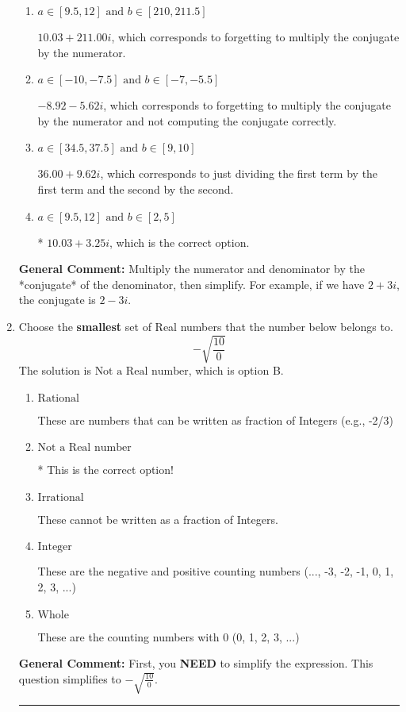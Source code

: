 \documentclass{extbook}[14pt]
\newcommand{\litem}[1]{\item #1

\rule{\textwidth}{0.4pt}}
\begin{document}
\begin{enumerate}
{\begin{enumerate}[label=\Alph*.]
 $652.00  + 3.25 i$, which corresponds to forgetting to multiply the conjugate by the numerator and using a plus instead of a minus in the denominator.
\item \( a \in [9.5, 12] \text{ and } b \in [210, 211.5] \)

 $10.03  + 211.00 i$, which corresponds to forgetting to multiply the conjugate by the numerator.
\item \( a \in [-10, -7.5] \text{ and } b \in [-7, -5.5] \)

 $-8.92  - 5.62 i$, which corresponds to forgetting to multiply the conjugate by the numerator and not computing the conjugate correctly.
\item \( a \in [34.5, 37.5] \text{ and } b \in [9, 10] \)

 $36.00  + 9.62 i$, which corresponds to just dividing the first term by the first term and the second by the second.
\item \( a \in [9.5, 12] \text{ and } b \in [2, 5] \)

* $10.03  + 3.25 i$, which is the correct option.
\end{enumerate}

\textbf{General Comment:} Multiply the numerator and denominator by the *conjugate* of the denominator, then simplify. For example, if we have $2+3i$, the conjugate is $2-3i$.
}
\litem{
Choose the \textbf{smallest} set of Real numbers that the number below belongs to.
\[ -\sqrt{\frac{10}{0}} \]The solution is \( \text{Not a Real number} \), which is option B.\begin{enumerate}[label=\Alph*.]
\item \( \text{Rational} \)

These are numbers that can be written as fraction of Integers (e.g., -2/3)
\item \( \text{Not a Real number} \)

* This is the correct option!
\item \( \text{Irrational} \)

These cannot be written as a fraction of Integers.
\item \( \text{Integer} \)

These are the negative and positive counting numbers (..., -3, -2, -1, 0, 1, 2, 3, ...)
\item \( \text{Whole} \)

These are the counting numbers with 0 (0, 1, 2, 3, ...)
\end{enumerate}

\textbf{General Comment:} First, you \textbf{NEED} to simplify the expression. This question simplifies to $-\sqrt{\frac{10}{0}}$. 
 
}
\end{enumerate}
\end{document}
